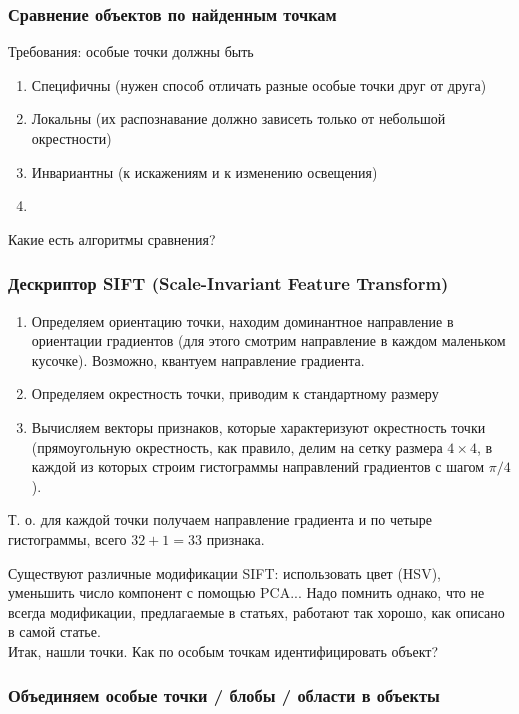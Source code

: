 \documentclass[main.tex]{subfiles}
\begin{document}
\subsubsection{Сравнение объектов по найденным точкам}

Требования: особые точки должны быть

\begin{enumerate}[noitemsep]
	\item Специфичны (нужен способ отличать разные особые точки друг от друга)
	\item Локальны (их распознавание должно зависеть только от небольшой окрестности)
	\item Инвариантны (к искажениям и к изменению освещения)
	\item 
\end{enumerate}
Какие есть алгоритмы сравнения?

\subsubsection{Дескриптор SIFT (Scale-Invariant Feature Transform)}

\begin{enumerate}[noitemsep]
	\item Определяем ориентацию точки, находим доминантное направление в ориентации градиентов (для этого смотрим направление в каждом маленьком кусочке).
	Возможно, квантуем направление градиента.
	\item Определяем окрестность точки, приводим к стандартному размеру
	\item Вычисляем векторы признаков, которые характеризуют окрестность точки (прямоугольную окрестность, как правило, делим на сетку размера $ 4 \times 4 $, в каждой из которых строим гистограммы направлений градиентов с шагом $\pi/4$).
\end{enumerate}

Т. о. для каждой точки получаем направление градиента и по четыре гистограммы, всего $ 32+1=33 $ признака.

Существуют различные модификации SIFT: использовать цвет (HSV), уменьшить число компонент с помощью PCA...
Надо помнить однако, что не всегда модификации, предлагаемые в статьях, работают так хорошо, как описано в самой статье. \\

Итак, нашли точки.
Как по особым точкам идентифицировать объект?

\subsubsection{Объединяем особые точки / блобы / области в объекты}
\end{document}
